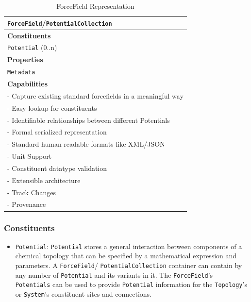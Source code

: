 \documentclass[12pt]{article}
\begin{document}
\begin{table}[ht]
    \centering
     \caption{ForceField Representation}
    \begin{tabular}{|l|}
         \hline
         \rowcolor{gray!50}
         \texttt{ForceField}/\texttt{PotentialCollection}  \\
         \hline
         \textbf{Constituents} \\
         \texttt{Potential} (0..n)\\
         \hline
         \textbf{Properties}\\
         \texttt{Metadata} \\
         \hline
         \textbf{Capabilities}\\
         \hline
         - Capture existing standard forcefields in a meaningful way\\
         - Easy lookup for constituents\\
         - Identifiable relationships between different Potentials\\
         - Formal serialized representation \\
         - Standard human readable formats like XML/JSON \\
         - Unit Support\\
         - Constituent datatype validation\\
         - Extensible architecture\\
         - Track Changes\\
         - Provenance \\
        \hline
    \end{tabular}
    \label{tab:ForceFieldSpec}
\end{table}

\subsubsection{Constituents}
\begin{itemize}
    \item \texttt{Potential}: \texttt{Potential} stores a general interaction between components of a chemical topology that can be specified by a mathematical expression and parameters. A \texttt{ForceField}/ \texttt{PotentialCollection} container can contain by any number of \texttt{Potential} and its variants in it. The \texttt{ForceField}'s \texttt{Potentials} can be used to provide \texttt{Potential} information for the \texttt{Topology}'s or \texttt{System}'s constituent sites and connections.
\end{itemize}
\end{document}
